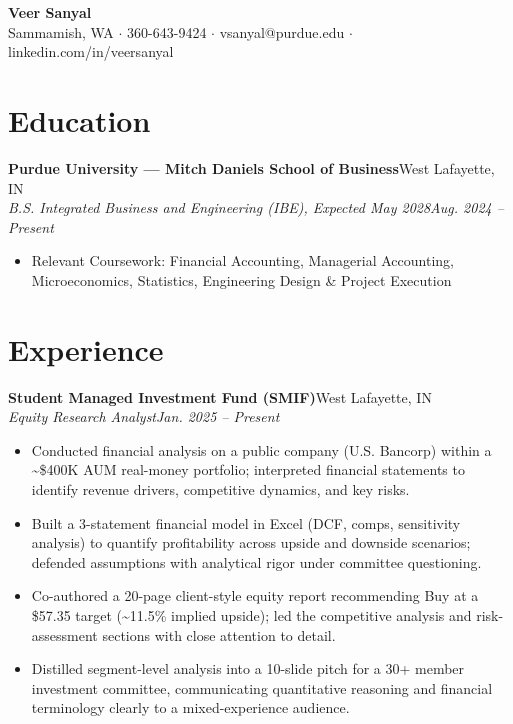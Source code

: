 \documentclass[10pt,letterpaper]{article}
\newcommand{\entry}[4]{%
  \textbf{#1}\hfill #2\\[1pt]
  \textit{#3}\hfill \textit{#4}\\[2pt]
}
\begin{document}
\begin{center}
  {\LARGE \textbf{Veer Sanyal}}\\[3pt]
  Sammamish, WA $\cdot$ 360-643-9424 $\cdot$ vsanyal@purdue.edu $\cdot$ linkedin.com/in/veersanyal
\end{center}

\section*{Education}
\textbf{Purdue University --- Mitch Daniels School of Business}\hfill West Lafayette, IN\\[1pt]
\textit{B.S. Integrated Business and Engineering (IBE), Expected May 2028}\hfill \textit{Aug. 2024 -- Present}
\begin{itemize}
  \item Relevant Coursework: Financial Accounting, Managerial Accounting, Microeconomics, Statistics, Engineering Design \& Project Execution
\end{itemize}

\section*{Experience}
\entry{Student Managed Investment Fund (SMIF)}{West Lafayette, IN}{Equity Research Analyst}{Jan. 2025 -- Present}
\begin{itemize}
  \item Conducted financial analysis on a public company (U.S. Bancorp) within a \textasciitilde\$400K AUM real-money portfolio; interpreted financial statements to identify revenue drivers, competitive dynamics, and key risks.
  \item Built a 3-statement financial model in Excel (DCF, comps, sensitivity analysis) to quantify profitability across upside and downside scenarios; defended assumptions with analytical rigor under committee questioning.
  \item Co-authored a 20-page client-style equity report recommending Buy at a \$57.35 target (\textasciitilde11.5\% implied upside); led the competitive analysis and risk-assessment sections with close attention to detail.
  \item Distilled segment-level analysis into a 10-slide pitch for a 30+ member investment committee, communicating quantitative reasoning and financial terminology clearly to a mixed-experience audience.
\end{itemize}
\end{document}
